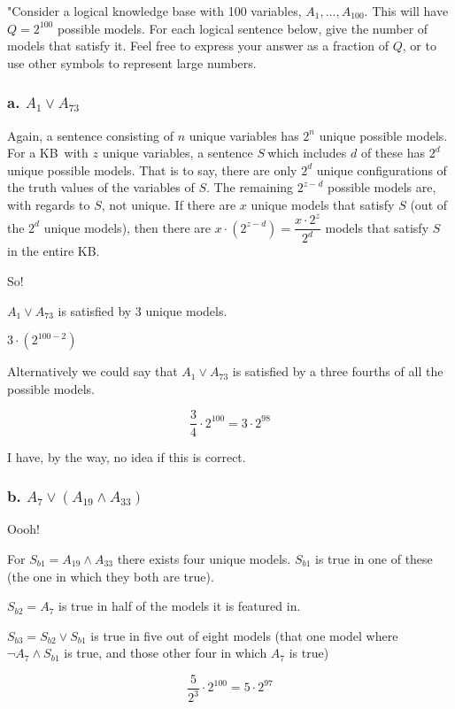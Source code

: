 \documentclass{article}
\begin{document}
"Consider a logical knowledge base with 100 variables, $A_{1},...,A_{100}$.
This will have $Q=2^{100}$ possible models. For each logical sentence below,
give the number of models that satisfy it. Feel free to express your answer
as a fraction of $Q$, or to use other symbols to represent large numbers.

\subsubsection{a. $A_{1}\vee A_{73}$}

Again, a sentence consisting of $n$ unique variables has $2^{n}$ unique
possible models. For a KB\ with $z$ unique variables, a sentence $S\ $which
includes $d$ of these has $2^{d}$ unique possible models. That is to say,
there are only $2^{d}$ unique configurations of the truth values of the
variables of $S$. The remaining $2^{z-d}$ possible models are, with regards
to $S$, not unique. If there are $x$ unique models that satisfy $S$ (out of
the $2^{d}$ unique models), then there are $x\cdot \left( 2^{z-d}\right) =%
\dfrac{x\cdot 2^{z}}{2^{d}}$ models that satisfy $S$ in the entire KB.

So!

$A_{1}\vee A_{73}$ is satisfied by $3$ unique models.

$3\cdot \left( 2^{100-2}\right) $

Alternatively we could say that $A_{1}\vee A_{73}$ is satisfied by a three
fourths of all the possible models.

\[
\dfrac{3}{4}\cdot 2^{100}=3\cdot 2^{98} 
\]

I have, by the way, no idea if this is correct.

\subsubsection{b. $A_{7}\vee \left( A_{19}\wedge A_{33}\right) $}

Oooh!

For $S_{b1}=A_{19}\wedge A_{33}$ there exists four unique models. $S_{b1}$
is true in one of these (the one in which they both are true).

$S_{b2}=A_{7}$ is true in half of the models it is featured in.

$S_{b3}=S_{b2}\vee S_{b1}$ is true in five out of eight models (that one
model where $\lnot A_{7}\wedge S_{b1}$ is true, and those other four in
which $A_{7}$ is true)

\[
\dfrac{5}{2^{3}}\cdot 2^{100}=5\cdot 2^{97} 
\]
\end{document}
